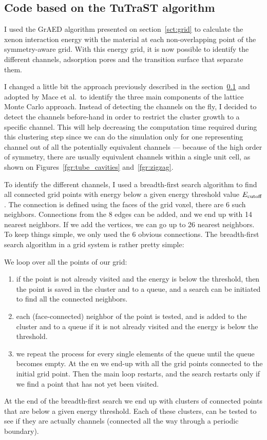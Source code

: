 \documentclass[main]{subfiles}
\begin{document}
\subsection{Code based on the TuTraST algorithm}\label{sct:tutrast}

I used the GrAED algorithm presented on section~\ref{sct:grid} to calculate the xenon interaction energy with the material at each non-overlapping point of the symmetry-aware grid. With this energy grid, it is now possible to identify the different channels, adsorption pores and the transition surface that separate them. 

I changed a little bit the approach previously described in the section~\ref{sct:tutrast} and adopted by Mace et al.\ to identify the three main components of the lattice Monte Carlo approach. Instead of detecting the channels on the fly, I decided to detect the channels before-hand in order to restrict the cluster growth to a specific channel. This will help decreasing the computation time required during this clustering step since we can do the simulation only for one representing channel out of all the potentially equivalent channels --- because of the high order of symmetry, there are usually equivalent channels within a single unit cell, as shown on Figures~\ref{fgr:tube_cavities} and~\ref{fgr:zigzag}. 

To identify the different channels, I used a breadth-first search algorithm to find all connected grid points with energy below a given energy threshold value $E_{\text{cutoff}}$. The connection is defined using the faces of the grid voxel, there are 6 such neighbors. Connections from the 8 edges can be added, and we end up with 14 nearest neighbors. If we add the vertices, we can go up to 26 nearest neighbors. To keep things simple, we only used the 6 obvious connections. The breadth-first search algorithm in a grid system is rather pretty simple:

We loop over all the points of our grid:
  \begin{enumerate}
    \item if the point is not already visited and the energy is below the threshold, then the point is saved in the cluster and to a queue, and a search can be initiated to find all the connected neighbors. 
    \item each (face-connected) neighbor of the point is tested, and is added to the cluster and to a queue if it is not already visited and the energy is below the threshold.
    \item we repeat the process for every single elements of the queue until the queue becomes empty. At the en we end-up with all the grid points connected to the initial grid point. Then the main loop restarts, and the search restarts only if we find a point that has not yet been visited.
  \end{enumerate}
At the end of the breadth-first search we end up with clusters of connected points that are below a given energy threshold. Each of these clusters, can be tested to see if they are actually channels (connected all the way through a periodic boundary). 
\end{document}
